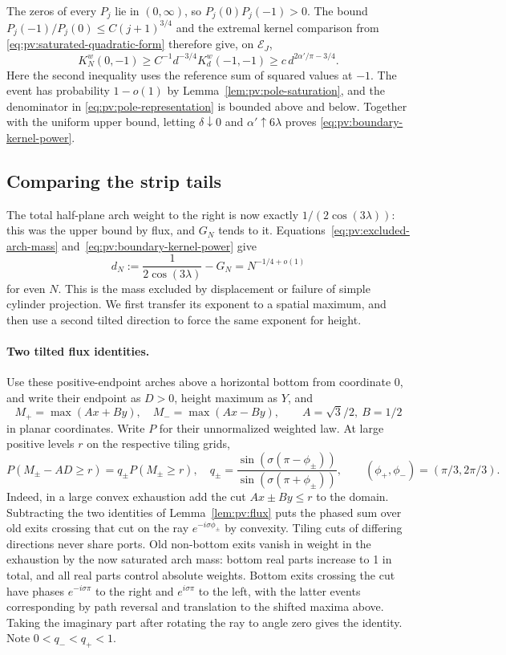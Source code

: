 The zeros of every \(P_j\) lie in \((0,\infty)\), so \(P_j(0)P_j(-1)>0\). The bound \(P_j(-1)/P_j(0)\le C(j+1)^{3/4}\) and the extremal kernel comparison from \eqref{eq:pv:saturated-quadratic-form} therefore give, on \(\mathcal E_J\),
\[
 K_N^w(0,-1)\ge C^{-1}d^{-3/4} K_d^w(-1,-1)
 \ge c\,d^{2\alpha'/\pi-3/4}.
\]
Here the second inequality uses the reference sum of squared values at \(-1\). The event has probability \(1-o(1)\) by Lemma~\ref{lem:pv:pole-saturation}, and the denominator in \eqref{eq:pv:pole-representation} is bounded above and below. Together with the uniform upper bound, letting \(\delta\downarrow0\) and \(\alpha'\uparrow6\lambda\) proves \eqref{eq:pv:boundary-kernel-power}.

\subsection{Comparing the strip tails}\label{c01-c1-comparing-the-strip-tails}

The total half-plane arch weight to the right is now exactly \(1/(2\cos(3\lambda))\): this was the upper bound by flux, and \(G_N\) tends to it. Equations~\eqref{eq:pv:excluded-arch-mass} and~\eqref{eq:pv:boundary-kernel-power} give
\[
 d_N:=\frac1{2\cos(3\lambda)}-G_N=N^{-1/4+o(1)}
\]
for even \(N\). This is the mass excluded by displacement or failure of simple cylinder projection. We first transfer its exponent to a spatial maximum, and then use a second tilted direction to force the same exponent for height.

\paragraph{Two tilted flux identities.}

Use these positive-endpoint arches above a horizontal bottom from coordinate 0, and write their endpoint as \(D>0\), height maximum as \(Y\), and
\[
 M_+=\max(A x+B y),\quad M_-=\max(A x-B y),\qquad A=\sqrt3/2,\ B=1/2
\]
in planar coordinates. Write \(P\) for their unnormalized weighted law. At large positive levels \(r\) on the respective tiling grids,
\[
 P(M_\pm-A D\ge r)=q_\pm P(M_\pm\ge r),\quad
 q_\pm=\frac{\sin(\sigma(\pi-\phi_\pm))}{\sin(\sigma(\pi+\phi_\pm))},\qquad
 (\phi_+,\phi_-)=(\pi/3,2\pi/3).
\]
Indeed, in a large convex exhaustion add the cut \(Ax\pm By\le r\) to the domain. Subtracting the two identities of Lemma~\ref{lem:pv:flux} puts the phased sum over old exits crossing that cut on the ray \(e^{-i\sigma\phi_\pm}\) by convexity. Tiling cuts of differing directions never share ports. Old non-bottom exits vanish in weight in the exhaustion by the now saturated arch mass: bottom real parts increase to 1 in total, and all real parts control absolute weights. Bottom exits crossing the cut have phases \(e^{-i\sigma\pi}\) to the right and \(e^{i\sigma\pi}\) to the left, with the latter events corresponding by path reversal and translation to the shifted maxima above. Taking the imaginary part after rotating the ray to angle zero gives the identity. Note \(0<q_-<q_+<1\).

